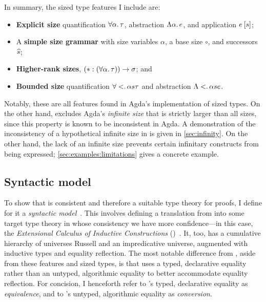 In summary, the sized type features I include are:
%
\begin{itemize}[noitemsep]
  \item \textbf{Explicit size} quantification $\forall \alpha \mathpunct{.} \tau$,
    abstraction $\Lambda \alpha \mathpunct{.} e$, and
    application $\App{e}{s}$;
  \item A \textbf{simple size grammar} with size variables $\alpha$, a base size $\circ$, and successors $\widehat{s}$;
  \item \textbf{Higher-rank sizes}, \eg $\arr*{(\Funtype{\alpha}{\tau})}{\sigma}$; and
  \item \textbf{Bounded size} quantification $\forall < \mathpunct{.} \alpha{s}{\tau}$ and
  abstraction $\Lambda < \mathpunct{.} \alpha{s}{e}$.
\end{itemize}

Notably, these are all features found in Agda's implementation of sized types.
On the other hand, \lang excludes Agda's \emph{infinite size}
that is strictly larger than all sizes,
since this property is known to be inconsistent in Agda.
A demonstration of the inconsistency of a hypothetical infinite size in \lang
is given in \cref{sec:infinity}.
On the other hand, the lack of an infinite size prevents
certain infinitary constructs from being expressed;
\cref{sec:examples:limitations} gives a concrete example.

\subsection{Syntactic model}\label{sec:syntactic-model}

To show that \lang is consistent and therefore a suitable type theory for proofs,
I define for it a \emph{syntactic model}~\citep{syntactic-models}.
This involves defining a translation from \lang into some target type theory
in whose consistency we have more confidence---in this case,
the \emph{Extensional Calculus of Inductive Constructions}
(\CICE)~\citep{CICE}.
It, too, has a cumulative hierarchy of universes \ala Russell and an impredicative universe,
augmented with inductive types and equality reflection.
The most notable difference from \lang, aside from these features and sized types,
is that \CICE uses a typed, declarative equality rather than an untyped, algorithmic equality
to better accommodate equality reflection.
For concision, I henceforth refer to \CICE's typed, declarative equality as \emph{equivalence},
and to \lang's untyped, algorithmic equality as \emph{conversion}.

